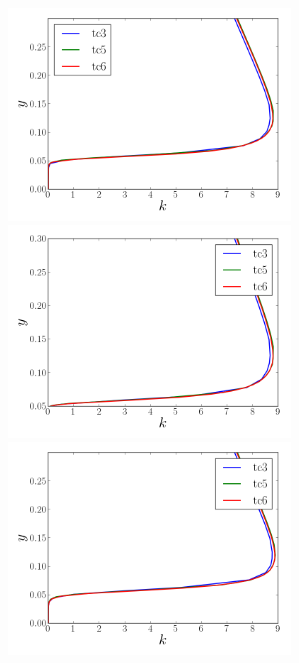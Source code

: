 \documentclass[12pt,oneside,a4paper]{article}
\begin{document}
\begin{figure}
\centering
\includegraphics[width=7.5cm]{images/CFD_meshIndependence/X1_k.png}\hfill \includegraphics[width=7.5cm]{images/CFD_meshIndependence/X2_k.png}\\
\includegraphics[width=7.5cm]{images/CFD_meshIndependence/X3_k.png}
\end{figure}
\end{document}
